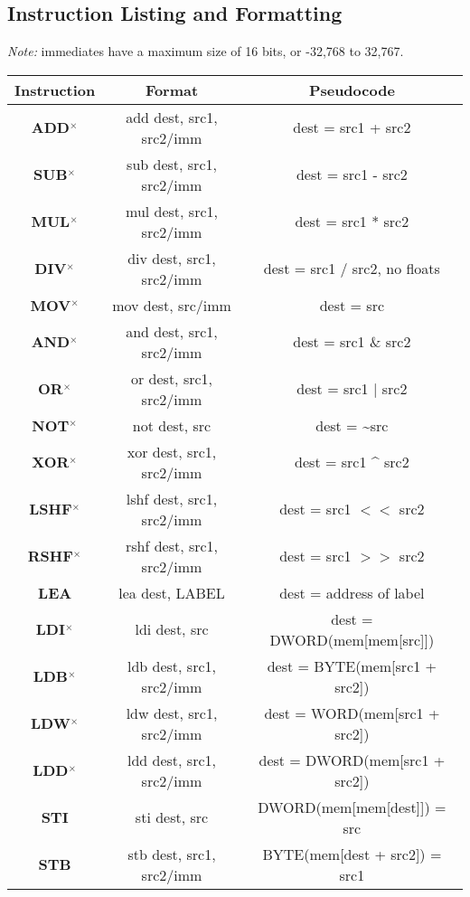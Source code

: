 \documentclass{article}
\newcommand*\scc[1]{{#1}\textbf{$^\times$}}
\begin{document}
\begin{tableofcontents}
\section{\Huge Instruction Listing and Formatting}
\label{sec:instructionList}
\begin{center}
\textit{Note:} immediates have a maximum size of 16 bits, or -32,768 to 32,767.
\begin{tabular}{|c|c|c|}
\hline
\textbf{Instruction} & \textbf{Format} & \textbf{Pseudocode} \\
\hline
\textbf{\scc{ADD}} & add dest, src1, src2/imm & dest = src1 + src2 \\
\hline
\textbf{\scc{SUB}} & sub dest, src1, src2/imm & dest = src1 - src2 \\
\hline
\textbf{\scc{MUL}} & mul dest, src1, src2/imm & dest = src1 * src2 \\
\hline
\textbf{\scc{DIV}} & div dest, src1, src2/imm & dest = src1 / src2, no floats \\
\hline
\textbf{\scc{MOV}} & mov dest, src/imm & dest = src \\
\hline
\textbf{\scc{AND}} & and dest, src1, src2/imm & dest = src1 \& src2 \\
\hline
\textbf{\scc{OR}} & or dest, src1, src2/imm & dest = src1 $|$ src2 \\
\hline
\textbf{\scc{NOT}} & not dest, src & dest = \~{}src \\
\hline
\textbf{\scc{XOR}} & xor dest, src1, src2/imm & dest = src1 \^{} src2 \\
\hline 
\textbf{\scc{LSHF}} & lshf dest, src1, src2/imm & dest = src1 $<$$<$ src2 \\
\hline
\textbf{\scc{RSHF}} & rshf dest, src1, src2/imm & dest = src1 $>$$>$ src2 \\
\hline
\textbf{LEA} & lea dest, LABEL & dest = address of label \\
\hline
\textbf{\scc{LDI}} & ldi dest, src & dest = DWORD(mem[mem[src]]) \\
\hline
\textbf{\scc{LDB}} & ldb dest, src1, src2/imm & dest = BYTE(mem[src1 + src2]) \\
\hline
\textbf{\scc{LDW}} & ldw dest, src1, src2/imm & dest = WORD(mem[src1 + src2]) \\
\hline
\textbf{\scc{LDD}} & ldd dest, src1, src2/imm & dest = DWORD(mem[src1 + src2]) \\
\hline
\textbf{STI} & sti dest, src & DWORD(mem[mem[dest]]) = src \\
\hline
\textbf{STB} & stb dest, src1, src2/imm & BYTE(mem[dest + src2]) = src1 \\

\end{tabular}
\end{center}
\end{tableofcontents}
\end{document}
